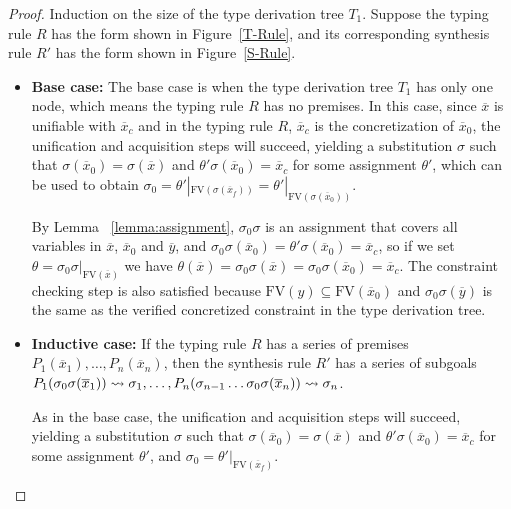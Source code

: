\documentclass[manuscript,screen]{acmart}
\newcommand{\meta}[1]{
  \ensuremath{%
    #1
  }
}
\newcommand{\mvhzc}{\text{FV}}
\begin{document}
\begin{proof}
  Induction on the size of the type derivation tree $T_1$. Suppose the typing rule $R$ has the form shown in Figure~\ref{T-Rule},  {\color{revblue}and } its corresponding synthesis rule $R'$ has the form shown in Figure~\ref{S-Rule}.
  \begin{itemize}
    \item \textbf{Base case:} 
    The base case is when the type derivation tree $T_1$ has only one node, which means the typing rule $R$ has no premises. 
    In this case, since $\overline{x}$ is unifiable with $\overline{x}_c$ and in the typing rule $R$, $\overline{x}_c$ is the concretization of $\overline{x}_0$, the unification and acquisition steps will succeed, yielding a substitution $\sigma$ such that $\sigma(\overline{x}_0) = \sigma(\overline{x})$ and $\theta'\sigma(\overline{x}_0) = \overline{x}_c$ for some assignment $\theta'$, which can be used to obtain $\sigma_0 = \theta'|_{\mvhzc(\sigma(\overline{x}_f))}= \theta'|_{\mvhzc(\sigma(\overline{x}_0))}$.

    By    {\color{revblue}Lemma} ~\ref{lemma:assignment}, $\sigma_0\sigma$ is an assignment that covers all variables in $\overline{x}$, $\overline{x}_0$ and $\overline{y}$, and $\sigma_0\sigma(\overline{x}_0) = \theta'\sigma(\overline{x}_0) = \overline{x}_c$, so if we set $\theta = \sigma_0\sigma|_{\mvhzc(\overline{x})}$ we have $\theta(\overline{x}) = \sigma_0\sigma(\overline{x})= \sigma_0\sigma(\overline{x}_0) = \overline{x}_c$. The constraint checking step is also satisfied because $\mvhzc(y)\subseteq \mvhzc(\overline{x}_0)$ and $\sigma_0\sigma(\overline{y})$ is the same as the verified concretized constraint in the type derivation tree.

    \item \textbf{Inductive case:} If the typing rule $R$ has a series  {\color{revblue}of } premises $P_1(\overline{x}_1), \ldots, P_n(\overline{x}_n)$, then the synthesis rule $R'$ has a series of subgoals $P_1(\meta{\sigma_0\sigma(\overline{x}_1)}) \leadsto \sigma_1, \ldots, P_n(\meta{\sigma_{n-1}\ldots\sigma_0\sigma(\overline{x}_n)}) \leadsto \sigma_n$.

       {\color{revblue}As in } the base case, the unification and acquisition steps will succeed, yielding a substitution $\sigma$ such that $\sigma(\overline{x}_0) = \sigma(\overline{x})$ and $\theta'\sigma(\overline{x}_0) = \overline{x}_c$ for some assignment $\theta'$, and   $\sigma_0 = \theta'|_{\mvhzc(\overline{x}_f)}$.


\end{itemize}
\end{proof}
\end{document}

